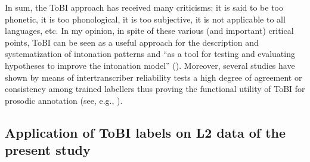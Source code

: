 In sum, the ToBI approach has received many criticisms: it is said to be too phonetic, it is too phonological, it is too subjective, it is not applicable to all languages, etc. In my opinion, in spite of these various (and important) critical points, ToBI can be seen as a useful approach for the description and systematization of intonation patterns and “as a tool for testing and evaluating hypotheses to improve the intonation model” (\citealt[518]{JunFletcher2014}). Moreover, several studies have shown by means of intertranscriber reliability tests a high degree of agreement or consistency among trained labellers thus proving the functional utility of ToBI for prosodic annotation (see, e.g., \citealt{PitrelliEtAl1994, YoonEtAl2004, EscuderoEtAl2012, MennenEtAl2012, Feldhausen2016, Elvira-GarcíaEtAl2016}).


\subsection{Application of ToBI labels on L2 data of the present study}\label{sec:2.2.3} %
